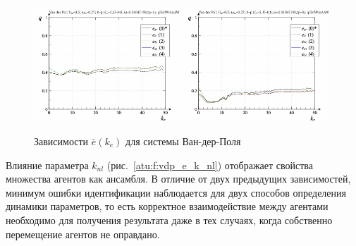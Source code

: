 \begin{figure}[ht!]
\begin{center}
  \includegraphics[width=0.49\textwidth]{p/cha/vdp/vdp_id-p_k_e_sign.png}
  \hfill
  \includegraphics[width=0.49\textwidth]{p/cha/vdp/vdp_id-p_k_e_sin.png}
\end{center}
  \caption{Зависимости $\bar{e}(k_e)$ для системы Ван-дер-Поля}
\label{atu:f:vdp_e_k_e}
\end{figure}

Влияние параметра $k_{nl}$ (рис.~\ref{atu:f:vdp_e_k_nl})
отображает свойства множества агентов как ансамбля.
В отличие от двух предыдущих зависимостей,
минимум ошибки идентификации наблюдается для двух
способов определения динамики параметров, то есть
корректное взаимодействие между агентами необходимо
для получения результата даже в тех случаях,
когда собственно перемещение агентов не оправдано.

